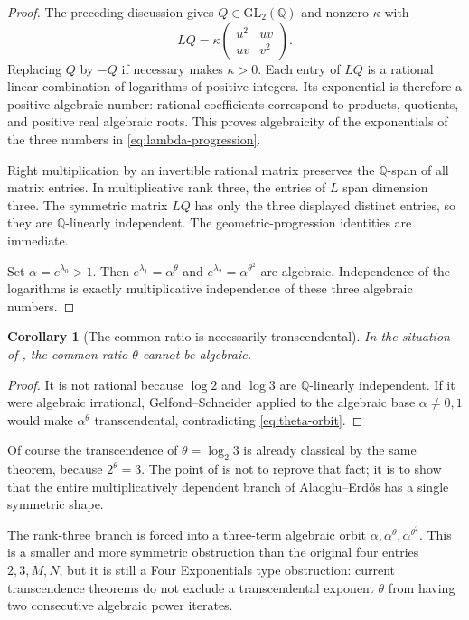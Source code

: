 \documentclass[11pt]{article}
\newtheorem{corollary}[theorem]{Corollary}
\theoremstyle{definition}
\theoremstyle{remark}
\newcommand{\Q}{\mathbb{Q}}
\begin{document}
\begin{proof}
The preceding discussion gives $Q\in\mathrm{GL}_2(\Q)$ and nonzero $\kappa$ with
\[
 LQ=\kappa
 \begin{pmatrix}u^2&uv\\uv&v^2\end{pmatrix}.
\]
Replacing $Q$ by $-Q$ if necessary makes $\kappa>0$.  Each entry of $LQ$ is a rational
linear combination of logarithms of positive integers.  Its exponential is therefore a
positive algebraic number: rational coefficients correspond to products, quotients, and
positive real algebraic roots.  This proves algebraicity of the exponentials of the three
numbers in \eqref{eq:lambda-progression}.

Right multiplication by an invertible rational matrix preserves the $\Q$-span of all matrix
entries.  In multiplicative rank three, the entries of $L$ span dimension three.  The
symmetric matrix $LQ$ has only the three displayed distinct entries, so they are
$\Q$-linearly independent.  The geometric-progression identities are immediate.

Set $\alpha=e^{\lambda_0}>1$.  Then
$e^{\lambda_1}=\alpha^\theta$ and
$e^{\lambda_2}=\alpha^{\theta^2}$ are algebraic.  Independence of the logarithms is exactly
multiplicative independence of these three algebraic numbers.
\end{proof}

\begin{corollary}[The common ratio is necessarily transcendental]
\label{cor:theta-transcendental-again}
In the situation of , the common ratio $\theta$ cannot be algebraic.
\end{corollary}

\begin{proof}
It is not rational because $\log2$ and $\log3$ are $\Q$-linearly independent.  If it were
algebraic irrational, Gelfond--Schneider applied to the algebraic base $\alpha\ne0,1$ would
make $\alpha^\theta$ transcendental, contradicting \eqref{eq:theta-orbit}.
\end{proof}

Of course the transcendence of $\theta=\log_2 3$ is already classical by the same theorem,
because $2^\theta=3$.  The point of  is not to reprove that fact; it
is to show that the entire multiplicatively dependent branch of Alaoglu--Erd\H{o}s has a
single symmetric shape.

\begin{resultbox}
The rank-three branch is forced into a three-term algebraic orbit
$\alpha,\alpha^\theta,\alpha^{\theta^2}$.  This is a smaller and more symmetric obstruction
than the original four entries $2,3,M,N$, but it is still a Four Exponentials type
obstruction: current transcendence theorems do not exclude a transcendental exponent
$\theta$ from having two consecutive algebraic power iterates.
\end{resultbox}
\end{document}
